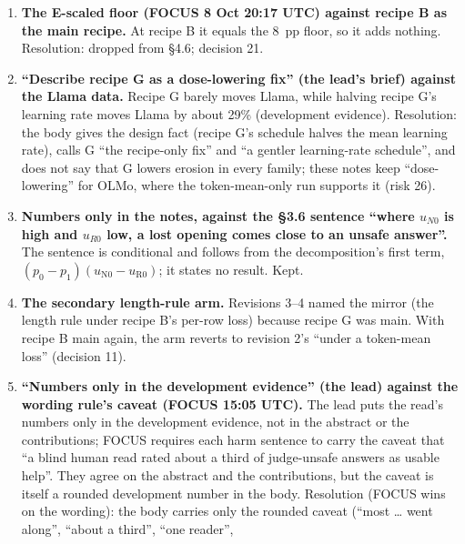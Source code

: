 \documentclass{article}
\theoremstyle{plain}
\theoremstyle{definition}
\theoremstyle{remark}
\begin{document}
\begin{enumerate}
        its disclosure, drops the scope phrase and marks the scope [TO BE
        FINALISED] (decision 16). \textbf{RESOLVED (revision 5c):} FOCUS 15:23
        UTC extends the rule to every family's Gate A read at its chosen
        learning rate; \S{}4.2 states the scope.
  \item \textbf{The E-scaled floor (FOCUS 8 Oct 20:17 UTC) against recipe B as
        the main recipe.} At recipe B it equals the 8~pp floor, so it adds
        nothing. Resolution: dropped from \S{}4.6; decision 21.
  \item \textbf{``Describe recipe G as a dose-lowering fix'' (the lead's brief)
        against the Llama data.} Recipe G barely moves Llama, while halving
        recipe G's learning rate moves Llama by about 29\% (development
        evidence). Resolution: the body gives the design fact (recipe G's
        schedule halves the mean learning rate), calls G ``the recipe-only fix''
        and ``a gentler learning-rate schedule'', and does not say that G lowers
        erosion in every family; these notes keep ``dose-lowering'' for OLMo,
        where the token-mean-only run supports it (risk 26).
  \item \textbf{Numbers only in the notes, against the \S{}3.6 sentence ``where
        $u_{N0}$ is high and $u_{R0}$ low, a lost opening comes close to an
        unsafe answer''.} The sentence is conditional and follows from the
        decomposition's first term, $(p_0 - p_1)(u_{\mathrm{N}0} -
        u_{\mathrm{R}0})$; it states no result. Kept.
  \item \textbf{The secondary length-rule arm.} Revisions 3--4 named the mirror
        (the length rule under recipe B's per-row loss) because recipe G was
        main. With recipe B main again, the arm reverts to revision 2's ``under
        a token-mean loss'' (decision 11).
  \item \textbf{``Numbers only in the development evidence'' (the lead) against
        the wording rule's caveat (FOCUS 15:05 UTC).} The lead puts the read's
        numbers only in the development evidence, not in the abstract or the
        contributions; FOCUS requires each harm sentence to carry the caveat
        that ``a blind human read rated about a third of judge-unsafe answers as
        usable help''. They agree on the abstract and the contributions, but the
        caveat is itself a rounded development number in the body. Resolution
        (FOCUS wins on the wording): the body carries only the rounded caveat
        (``most \ldots{} went along'', ``about a third'', ``one reader'',

\end{enumerate}
\end{document}
